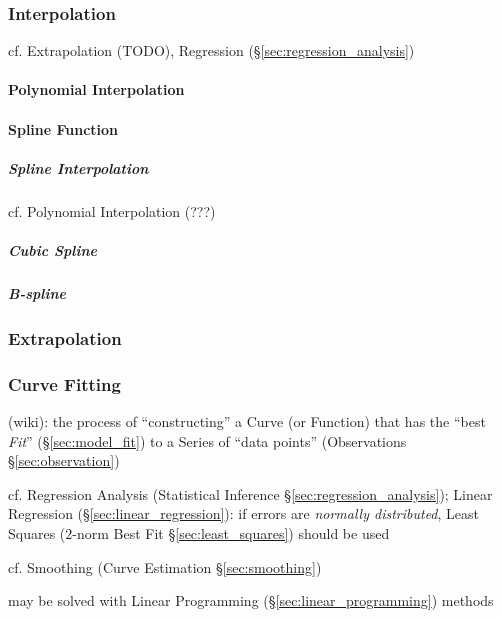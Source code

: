 \subsubsection{Interpolation}\label{sec:interpolation}

cf. Extrapolation (TODO), Regression (\S\ref{sec:regression_analysis})



\paragraph{Polynomial Interpolation}\label{sec:polynomial_interpolation}\hfill

\paragraph{Spline Function}\label{sec:spline}\hfill

\subparagraph{Spline Interpolation}\label{sec:spline_interpolation}\hfill

cf. Polynomial Interpolation (???) %



\subparagraph{Cubic Spline}\label{sec:cubic_spline}\hfill

\subparagraph{B-spline}\label{sec:b_spline}\hfill



\subsubsection{Extrapolation}\label{sec:extrapolation}

\subsubsection{Curve Fitting}\label{sec:curve_fitting}

(wiki): the process of ``constructing'' a Curve (or Function) that has the
``best \emph{Fit}'' (\S\ref{sec:model_fit}) to a Series of ``data points''
(Observations \S\ref{sec:observation})

\fist cf. Regression Analysis (Statistical Inference
\S\ref{sec:regression_analysis}); Linear Regression
(\S\ref{sec:linear_regression}): if errors are \emph{normally distributed},
Least Squares ($2$-norm Best Fit \S\ref{sec:least_squares}) should be used

cf. Smoothing (Curve Estimation \S\ref{sec:smoothing})

may be solved with Linear Programming (\S\ref{sec:linear_programming}) methods



